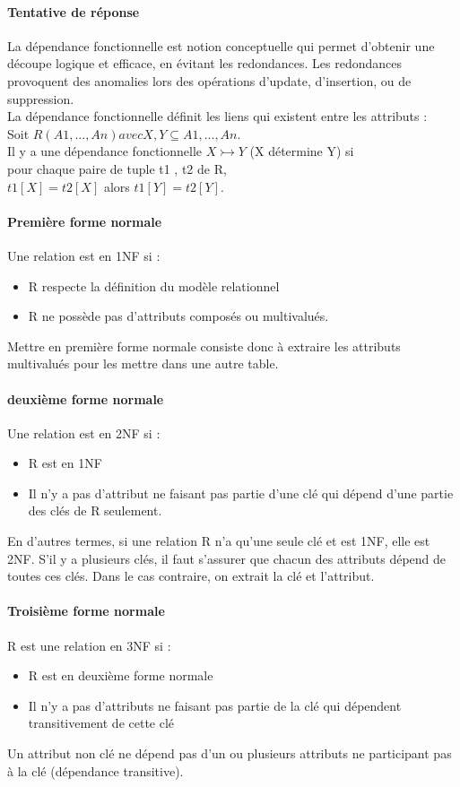 \paragraph{Tentative de réponse}
La dépendance fonctionnelle est notion conceptuelle qui permet d'obtenir 
une découpe logique et efficace, en évitant les redondances. 
Les redondances provoquent des anomalies lors des opérations d'update, 
d'insertion, ou de suppression.\\
La dépendance fonctionnelle définit les liens qui existent entre les attributs :
\\
Soit $R(A1, ..., An) avec X, Y \subseteq {A1 ,..., An }.$ \\
Il y a une dépendance fonctionnelle $X \rightarrowtail Y$ (X détermine Y)
si \\
pour chaque paire de tuple t1 , t2 de R,\\
$t1[X] = t2[X]$ alors $t1[Y] = t2[Y]$.\\


\paragraph{Première forme normale}
Une relation est en 1NF si : 
\begin{itemize}
	\item R respecte la définition du modèle relationnel
	\item R ne possède pas d'attributs composés ou multivalués.
\end{itemize}
Mettre en première forme normale consiste donc à extraire les attributs multivalués pour les mettre dans une autre table.

\paragraph{deuxième forme normale}
Une relation est en 2NF si : 
\begin{itemize}
	\item R est en 1NF
	\item Il n'y a pas d'attribut ne faisant pas partie d'une clé qui dépend 
	d'une partie des clés de R seulement.
\end{itemize}
En d'autres termes, si une relation R n'a qu'une seule clé et est 1NF, 
elle est 2NF. S'il y a plusieurs clés, il faut s'assurer que chacun des attributs 
dépend de toutes ces clés. Dans le cas contraire, on extrait la clé et l'attribut.


\paragraph{Troisième forme normale}
R est une relation en 3NF si : 
\begin{itemize}
	\item R est en deuxième forme normale
	\item Il n'y a pas d'attributs ne faisant pas partie de la clé qui dépendent 
	transitivement de cette clé
\end{itemize}

Un attribut non clé ne dépend pas d'un ou plusieurs attributs ne participant pas à la clé (dépendance transitive).

